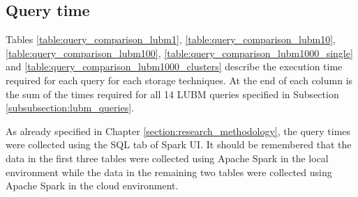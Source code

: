 \documentclass[10pt, a4paper]{report}
\begin{document}
\subsection{Query time}

Tables \ref{table:query_comparison_lubm1}, \ref{table:query_comparison_lubm10}, \ref{table:query_comparison_lubm100}, \ref{table:query_comparison_lubm1000_single} and \ref{table:query_comparison_lubm1000_clusters} describe the execution time required for each query for each storage techniques. At the end of each column is the sum of the times required for all 14 LUBM queries specified in Subsection \ref{subsubsection:lubm_queries}.

As already specified in Chapter \ref{section:research_methodology}, the query times were collected using the SQL tab of Spark UI. It should be remembered that the data in the first three tables were collected using Apache Spark in the local environment while the data in the remaining two tables were collected using Apache Spark in the cloud environment.
\end{document}
